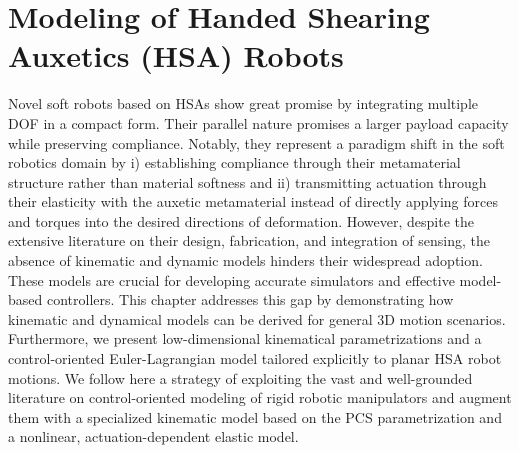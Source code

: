 \chapter{Modeling of Handed Shearing Auxetics (HSA) Robots}
\label{chp:hsamodel}

\begin{foreword}
    Novel soft robots based on \glspl{HSA} show great promise by integrating multiple \gls{DOF} in a compact form. Their parallel nature promises a larger payload capacity while preserving compliance. Notably, they represent a paradigm shift in the soft robotics domain by i) establishing compliance through their metamaterial structure rather than material softness and ii) transmitting actuation through their elasticity with the auxetic metamaterial instead of directly applying forces and torques into the desired directions of deformation.
    However, despite the extensive literature on their design, fabrication, and integration of sensing, the absence of kinematic and dynamic models hinders their widespread adoption. These models are crucial for developing accurate simulators and effective model-based controllers.
    This chapter addresses this gap by demonstrating how kinematic and dynamical models can be derived for general 3D motion scenarios. Furthermore, we present low-dimensional kinematical parametrizations and a control-oriented Euler-Lagrangian model tailored explicitly to planar \gls{HSA} robot motions.
    We follow here a strategy of exploiting the vast and well-grounded literature on control-oriented modeling of rigid robotic manipulators and augment them with a specialized kinematic model based on the \gls{PCS} parametrization and a nonlinear, actuation-dependent elastic model.
\end{foreword}



